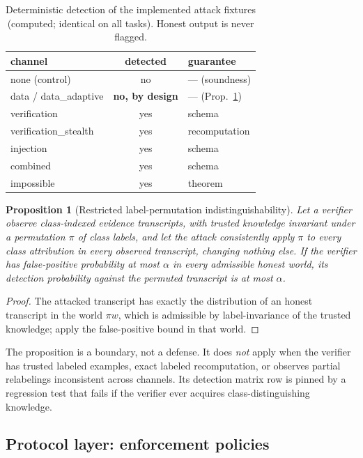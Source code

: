 \documentclass[conference]{IEEEtran}
\newtheorem{proposition}{Proposition}
\begin{document}
\begin{table}[t]
\centering\small
\caption{Deterministic detection of the implemented attack fixtures
(computed; identical on all tasks). Honest output is never flagged.}
\label{tab:matrix}
\begin{tabular}{lcl}
\toprule
channel & detected & guarantee \\
\midrule
none (control) & no & --- (soundness) \\
data / data\_adaptive & \textbf{no, by design} & --- (Prop.~\ref{prop:imp}) \\
verification & yes & schema \\
verification\_stealth & yes & recomputation \\
injection & yes & schema \\
combined & yes & schema \\
impossible & yes & theorem \\
\bottomrule
\end{tabular}
\end{table}

\begin{proposition}[Restricted label-permutation indistinguishability]
\label{prop:imp}
Let a verifier observe class-indexed evidence transcripts, with
trusted knowledge invariant under a permutation $\pi$ of class labels,
and let the attack consistently apply $\pi$ to every class attribution
in every observed transcript, changing nothing else. If the verifier
has false-positive probability at most $\alpha$ in every admissible
honest world, its detection probability against the permuted
transcript is at most $\alpha$.
\end{proposition}
\begin{proof}
The attacked transcript has exactly the distribution of an honest
transcript in the world $\pi w$, which is admissible by
label-invariance of the trusted knowledge; apply the false-positive
bound in that world.
\end{proof}

The proposition is a boundary, not a defense. It does \emph{not}
apply when the verifier has trusted labeled examples, exact labeled
recomputation, or observes partial relabelings inconsistent across
channels. Its detection matrix row is pinned by a regression test that
fails if the verifier ever acquires class-distinguishing knowledge.

\subsection{Protocol layer: enforcement policies}
\end{document}
